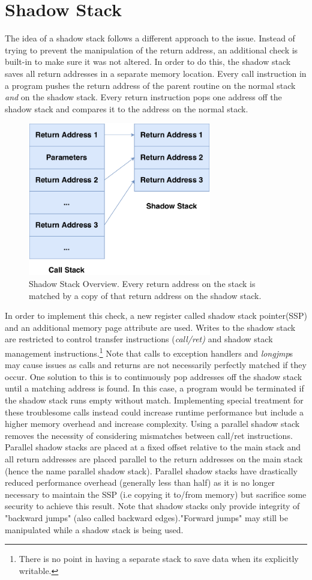 \documentclass[10pt,twocolumn,a4paper]{article}
\begin{document}
\section{Shadow Stack}\label{shadowstack}
The idea of a shadow stack follows a different approach to the issue.
Instead of trying to prevent the manipulation of the return address, an additional check is built-in to make sure it was not altered.
In order to do this, the shadow stack saves all return addresses in a separate memory location.
Every call instruction in a program pushes the return address of the parent routine on the normal stack \emph{and} on the shadow stack.
Every return instruction pops one address off the shadow stack and compares it to the address on the normal stack.
\begin{figure}[h]
\includegraphics[keepaspectratio,width=8cm]{fig/ShadowStack}
\caption{Shadow Stack Overview. Every return address on the stack is matched by a copy of that return address on the shadow stack.}
\end{figure}

In order to implement this check, a new register called shadow stack pointer(SSP) and an additional memory page attribute are used.
Writes to the shadow stack are restricted to control transfer instructions (\emph{call/ret)} and shadow stack management instructions.\footnote{There is no point in having a separate stack to save data when its explicitly writable.}
Note that calls to exception handlers and \emph{longjmp}s may cause issues as calls and returns are not necessarily perfectly matched if they occur\cite{light}.
One solution to this is to continuously pop addresses off the shadow stack until a matching address is found. In this case, a program would be terminated if the shadow stack runs empty without match.
Implementing special treatment for these troublesome calls instead could increase runtime performance but include a higher memory overhead and increase complexity.
Using a parallel shadow stack removes the necessity of considering mismatches between call/ret instructions.
Parallel shadow stacks are placed at a fixed offset relative to the main stack and all return addresses are placed parallel to the return addresses on the main stack (hence the name parallel shadow stack). 
Parallel shadow stacks have drastically reduced performance overhead (generally less than half) as it is no longer necessary to maintain the SSP (i.e copying it to/from memory) but sacrifice some security to achieve this result\cite{performance}.
Note that shadow stacks only provide integrity of "backward jumps" (also called backward edges)."Forward jumps" may still be manipulated while a shadow stack is being used.
\end{document}
